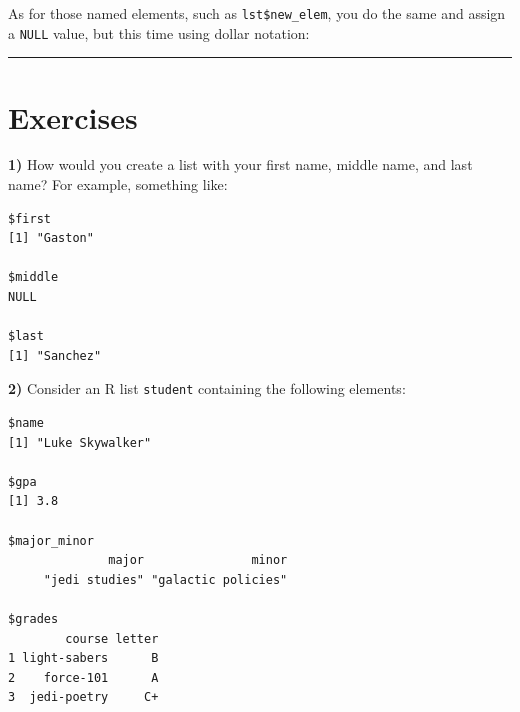 \documentclass[
]{book}
\newenvironment{Shaded}{\begin{snugshade}}{\end{snugshade}}
\newcommand{\CommentTok}[1]{\textcolor[rgb]{0.56,0.35,0.01}{\textit{#1}}}
\newcommand{\ConstantTok}[1]{\textcolor[rgb]{0.00,0.00,0.00}{#1}}
\newcommand{\NormalTok}[1]{#1}
\newcommand{\OtherTok}[1]{\textcolor[rgb]{0.56,0.35,0.01}{#1}}
\newcommand{\SpecialCharTok}[1]{\textcolor[rgb]{0.00,0.00,0.00}{#1}}
\begin{document}
As for those named elements, such as \texttt{lst\$new\_elem}, you do the same and assign
a \texttt{NULL} value, but this time using dollar notation:

\begin{Shaded}
\end{Shaded}

\begin{center}\rule{0.5\linewidth}{0.5pt}\end{center}

\hypertarget{exercises-2}{%
\section{Exercises}\label{exercises-2}}

\textbf{1)} How would you create a list with your first name, middle name, and last
name? For example, something like:

\begin{verbatim}
$first
[1] "Gaston"

$middle
NULL

$last
[1] "Sanchez"
\end{verbatim}

\textbf{2)} Consider an R list \texttt{student} containing the following elements:

\begin{verbatim}
$name
[1] "Luke Skywalker"

$gpa
[1] 3.8

$major_minor
              major               minor 
     "jedi studies" "galactic policies" 

$grades
        course letter
1 light-sabers      B
2    force-101      A
3  jedi-poetry     C+
\end{verbatim}
\end{document}
